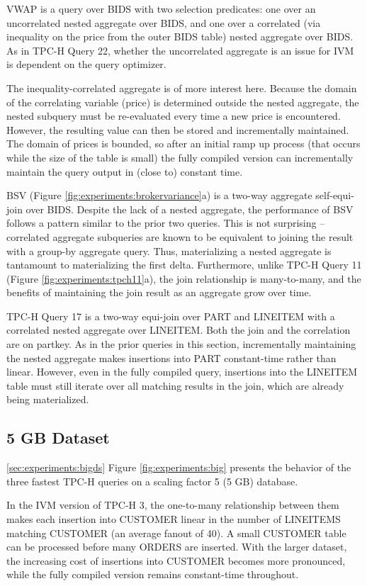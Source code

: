 VWAP is a query over BIDS with two selection predicates: one over an uncorrelated nested aggregate over BIDS, and one over a correlated (via inequality on the price from the outer BIDS table) nested aggregate over BIDS.  As in TPC-H Query 22, whether the uncorrelated aggregate is an issue for IVM is dependent on the query optimizer.  

The inequality-correlated aggregate is of more interest here.  Because the domain of the correlating variable (price) is determined outside the nested aggregate, the nested subquery must be re-evaluated every time a new price is encountered.  However, the resulting value can then be stored and incrementally maintained.  The domain of prices is bounded, so after an initial ramp up process (that occurs while the size of the table is small) the fully compiled version can incrementally maintain the query output in (close to) constant time.

BSV (Figure \ref{fig:experiments:brokervariance}a) is a two-way aggregate self-equi-join over BIDS.  Despite the lack of a nested aggregate, the performance of BSV follows a pattern similar to the prior two queries.  This is not surprising -- correlated aggregate subqueries are known to be equivalent to joining the result with a group-by aggregate query.  Thus, materializing a nested aggregate is tantamount to materializing the first delta.  Furthermore, unlike TPC-H Query 11 (Figure \ref{fig:experiments:tpch11}a), the join relationship is many-to-many, and the benefits of maintaining the join result as an aggregate grow over time.

TPC-H Query 17 is a two-way equi-join over PART and LINEITEM with a correlated nested aggregate over LINEITEM.  Both the join and the correlation are on partkey.  As in the prior queries in this section, incrementally maintaining the nested aggregate makes insertions into PART constant-time rather than linear.  However, even in the fully compiled query, insertions into the LINEITEM table must still iterate over all matching results in the join, which are already being materialized.  

\subsection{5 GB Dataset}
\ref{sec:experiments:bigds}
Figure \ref{fig:experiments:big} presents the behavior of the three fastest TPC-H queries on a scaling factor 5 (5 GB) database.

In the IVM version of TPC-H 3, the one-to-many relationship between them makes each insertion into CUSTOMER linear in the number of LINEITEMS matching CUSTOMER (an average fanout of 40).  A small CUSTOMER table can be processed before many ORDERS are inserted.  With the larger dataset, the increasing cost of insertions into CUSTOMER becomes more pronounced, while the fully compiled version remains constant-time throughout.

